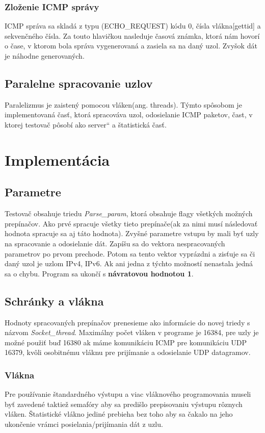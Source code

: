 \documentclass[11pt,a4paper]{report}
\newcommand{\myuv}[1]{\quotedblbase #1\textquotedblleft}
\begin{document}
\subsection{Zloženie ICMP správy}
ICMP správa sa skladá z typu (ECHO\_REQUEST) kódu 0, čísla vlákna[gettid] a sekvenčného čísla. Za touto hlavičkou nasleduje časová známka, ktorá nám hovorí o čase, v ktorom bola správa vygenerovaná a zasiela sa na daný uzol. Zvyšok dát je náhodne generovaných.

\section{Paralelne spracovanie uzlov}
Paralelizmus je zaistený pomocou vláken(ang. threads). Týmto spôsobom je implementovaná časť, ktorá spracováva uzol, odosielanie ICMP paketov, čast, v ktorej testovač pôsobí ako \myuv{server} a štatistická časť.

\chapter{Implementácia}
\section{Parametre}
\label{param} Testovač obsahuje triedu \emph{Parse\_param}, ktorá obsahuje flagy všetkých možných prepínačov. Ako prvé spracuje všetky tieto prepínače(ak za nimi musí následovať hodnota spracuje sa aj táto hodnota). Zvyšné parametre vstupu by mali byť uzly na spracovanie a odosielanie dát. Zapíšu sa do vektora nespracovaných parametrov po prvom prechode. Potom sa tento vektor vyprázdni a zisťuje sa či daný uzol je uzlom IPv4, IPv6. Ak ani jedna z týchto možností nenastala jedná sa o chybu. Program sa ukončí s \textbf{návratovou hodnotou 1}.
\section{Schránky a vlákna}
Hodnoty spracovaných prepínačov prenesieme ako informácie do novej triedy s názvom \emph{Socket\_thread}. Maximálny počet vláken v programe je 16384, pre uzly je možné použiť buď 16380 ak máme komunikáciu ICMP pre komunikáciu UDP 16379, kvôli osobitnému vláknu pre prijímanie a odosielanie UDP datagramov.
\subsection{Vlákna}
Pre používanie štandardného výstupu a viac vláknového programovania museli byť zavedené taktiež semafóry aby sa predišlo prepisovaniu výstupu rôznych vláken. Štatistické vlákno jediné prebieha bez toho aby sa čakalo na jeho ukončenie vrámci posielania/prijímania dát z uzlu\footnotemark.
\end{document}
